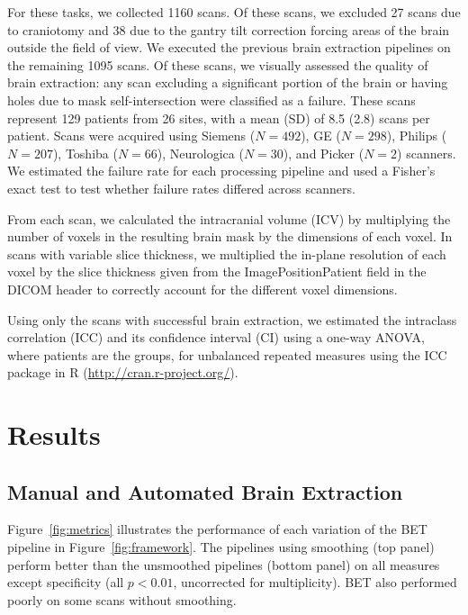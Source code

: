 \documentclass{elsarticle}\usepackage[]{graphicx}\usepackage[]{color}
\begin{document}
For these tasks, we collected 1160 scans.  Of these scans, we excluded 27 scans due to craniotomy and 38 due to the gantry tilt correction forcing areas of the brain outside the field of view.   We executed the previous brain extraction pipelines on the remaining 1095 scans.  Of these scans, we visually assessed the quality of brain extraction: any scan excluding a significant portion of the brain or having holes due to mask self-intersection were classified as a failure.  These scans represent 129 patients from 26 sites, with a mean (SD) of 8.5 (2.8) scans per patient.  Scans were acquired using Siemens ($N=492$), GE ($N=298$), Philips ($N=207$), Toshiba ($N=66$), Neurologica ($N=30$), and Picker ($N=2$) scanners.  We estimated the failure rate for each processing pipeline and used a Fisher's exact test to test whether failure rates differed across scanners.

From each scan, we calculated the intracranial volume (ICV) by multiplying the number of voxels in the resulting brain mask by the dimensions of each voxel.  In scans with variable slice thickness, we multiplied the in-plane resolution of each voxel by the slice thickness given from the ImagePositionPatient field in the DICOM header to correctly account for the different voxel dimensions.  

Using only the scans with successful brain extraction, we estimated the intraclass correlation (ICC) and its confidence interval (CI) using a one-way ANOVA, where patients are the groups, for unbalanced repeated measures \citep{searle_linear_2012, thomas_interval_1978, donner_use_1979, lessells_unrepeatable_1987} using the ICC package \citep{wolak_guidelines_2012} in R (\url{http://cran.r-project.org/}).  




\section{Results}
\subsection{Manual and Automated Brain Extraction}
Figure~\ref{fig:metrics}\protect{} illustrates the performance of each variation of the BET pipeline in Figure~\ref{fig:framework}.  The pipelines using smoothing (top panel) perform better than the unsmoothed pipelines (bottom panel) on all measures except specificity (all $p < 0.01$, uncorrected for multiplicity).  BET also performed poorly on some scans without smoothing.  
\end{document}
